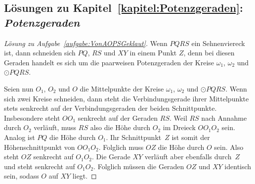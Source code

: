 \subsection*{Lösungen zu Kapitel~\ref{kapitel:Potenzgeraden}: \emph{Potenzgeraden}}
\begin{proof}[Lösung zu Aufgabe~\ref{aufgabe:VonAOPSGeklaut}]
	Wenn $PQRS$ ein Sehnenviereck ist, dann schneiden sich $PQ$, $RS$ und $XY$ in einem Punkt $Z$, denn bei diesen Geraden handelt es sich um die paarweisen Potenzgeraden der Kreise $\omega_1$, $\omega_2$ und $\odot PQRS$.
	
	Seien nun $O_1$, $O_2$ und $O$ die Mittelpunkte der Kreise $\omega_1$, $\omega_2$ und $\odot PQRS$. Wenn sich zwei Kreise schneiden, dann steht die Verbindungsgerade ihrer Mittelpunkte stets senkrecht auf der Verbindungsgeraden der beiden Schnittpunkte. Insbesondere steht $OO_1$ senkrecht auf der Geraden $RS$. Weil $RS$ nach Annahme durch $O_2$ verläuft, muss $RS$ also die Höhe durch $O_2$ im Dreieck $OO_1O_2$ sein. Analog ist $PQ$ die Höhe durch $O_1$. Ihr Schnittpunkt~$Z$ ist somit der Höhenschnittpunkt von $OO_1O_2$. Folglich muss $OZ$ die Höhe durch $O$ sein. Also steht $OZ$ senkrecht auf $O_1O_2$. Die Gerade $XY$ verläuft aber ebenfalls durch~$Z$ und steht senkrecht auf $O_1O_2$. Folglich müssen die Geraden $OZ$ und $XY$ identisch sein, sodass $O$ auf $XY$ liegt.
\end{proof}


